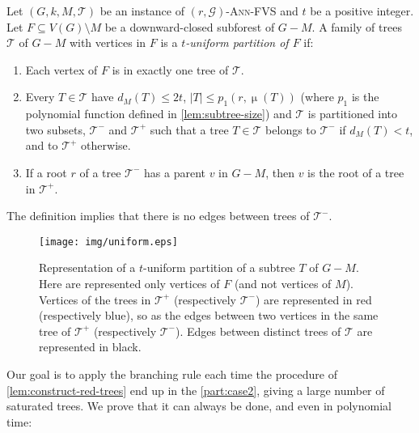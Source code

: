 \documentclass{amsart}
\newcommand{\G}{\mathcal{G}}
\newcommand{\mT}{\mathcal{T}}
\DeclareMathOperator\db{\mu}
\newcommand{\AFVS}{\textsc{$(r,\G)$-Ann-FVS}\xspace}
\begin{document}
\begin{definition}\label{def:unif}
Let $(G,k,M,\mT)$ be an instance of \AFVS and $t$ be a positive integer.  Let $F \subseteq V(G)\setminus M$ be a downward-closed subforest of $G-M$. A family of trees $\mT$ of $G-M$ with vertices in $F$ is a \emph{$t$-uniform partition of $F$} if:
    \begin{enumerate}
    \item \label{item:unif1} Each vertex of $F$ is in exactly one tree of $\mT$.
    \item \label{item:unif2}Every $T\in \mT$ have $d_M(T)\le 2t$, $|T|\leq p_1(r,\db(T))$ (where $p_1$ is the polynomial function defined in \autoref{lem:subtree-size}) and $\mT$ is partitioned into two subsets, $\mT^-$ and $\mT^+$ such that a tree $T\in \mT$ belongs to $\mT^-$ if $d_M(T)<t$, and to $\mT^+$ otherwise.
    \item \label{item:unif3} If a root $r$ of a tree $\mT^-$ has a parent $v$ in $G-M$, then $v$ is the root of a tree in $\mT^+$.
\end{enumerate}
\end{definition}
\begin{remark}
The definition implies that there is no edges between trees of $\mT^-$.
\end{remark}
\begin{figure}
    \centering
    \texttt{[image: img/uniform.eps]}
    \caption{Representation of a $t$-uniform partition of a subtree $T$ of $G-M$. Here are represented only vertices of $F$ (and not vertices of $M$). Vertices of the trees in $\mT^+$ (respectively $\mT^-$) are represented in red (respectively blue), so as the edges between two vertices in the same tree of $\mT^+$ (respectively $\mT^-$). Edges between distinct trees of $\mT$ are represented in black. }
    \label{fig:uniform}
\end{figure}


Our goal is to apply the branching rule each time the procedure of \autoref{lem:construct-red-trees} end up in the \autoref{part:case2}, giving a large number of saturated trees. We prove that it can always be done, and even in polynomial time:
\end{document}
